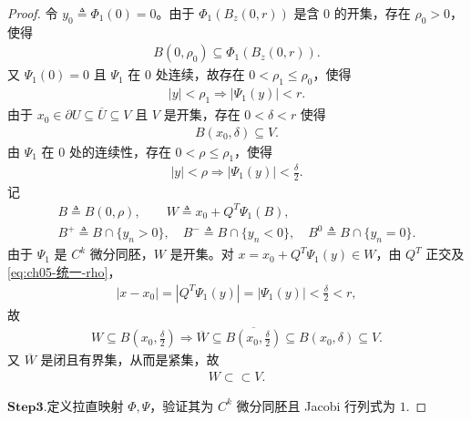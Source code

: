 \documentclass[../../main.tex]{subfiles}
\begin{document}
\begin{proof}
令 $y_0\triangleq\Phi_1(0)=0$。由于 $\Phi_1(B_z(0,r))$ 是含 $0$ 的开集，存在 $\rho_0>0$，使得
\begin{align*}
B(0,\rho_0)\subseteq\Phi_1(B_z(0,r)).
\end{align*}
又 $\Psi_1(0)=0$ 且 $\Psi_1$ 在 $0$ 处连续，故存在 $0<\rho_1\leqslant\rho_0$，使得
\begin{align}
|y|<\rho_1\Longrightarrow|\Psi_1(y)|<r.
\label{eq:ch05-统一-rho1}
\end{align}
由于 $x_0\in\partial U\subseteq\overline{U}\subseteq V$ 且 $V$ 是开集，存在 $0<\delta<r$ 使得
\begin{align}
B(x_0,\delta)\subseteq V.
\label{eq:ch05-统一-delta}
\end{align}
由 $\Psi_1$ 在 $0$ 处的连续性，存在 $0<\rho\leqslant\rho_1$，使得
\begin{align}
|y|<\rho\Longrightarrow|\Psi_1(y)|<\frac{\delta}{2}.
\label{eq:ch05-统一-rho}
\end{align}
记
\begin{gather*}
B\triangleq B(0,\rho),\qquad
W\triangleq x_0+Q^{T}\Psi_1(B),\\
B^{+}\triangleq B\cap\{y_n>0\},\quad
B^{-}\triangleq B\cap\{y_n<0\},\quad
B^{0}\triangleq B\cap\{y_n=0\}.
\end{gather*}
由于 $\Psi_1$ 是 $C^{k}$ 微分同胚，$W$ 是开集。对 $x=x_0+Q^{T}\Psi_1(y)\in W$，由 $Q^{T}$ 正交及 \eqref{eq:ch05-统一-rho}，
\begin{align*}
|x-x_0|=|Q^{T}\Psi_1(y)|=|\Psi_1(y)|<\frac{\delta}{2}<r,
\end{align*}
故
\begin{align}
W\subseteq B\left( x_0,\frac{\delta}{2} \right)\Longrightarrow \overline{W}\subseteq\overline{B\left(x_0,\frac{\delta}{2}\right)}
\subseteq B(x_0,\delta)\subseteq V.
\label{eq:ch05-统一-W紧含}
\end{align}
又 $\overline{W}$ 是闭且有界集，从而是紧集，故
\begin{align}
W\subset\subset V.
\label{eq:ch05-统一-W紧含2}
\end{align}

\noindent$\mathbf{Step}\bm{3}$.{\heiti 定义拉直映射 $\Phi,\Psi$，验证其为 $C^{k}$ 微分同胚且 Jacobi 行列式为 $1$.}


\end{proof}
\end{document}
